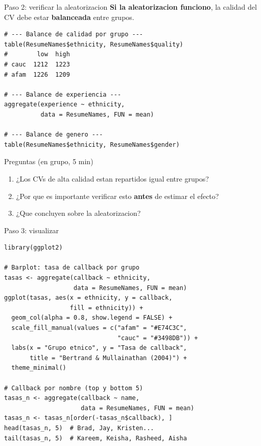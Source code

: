 \documentclass[aspectratio=169, 11pt]{beamer}
\begin{document}
\begin{frame}[fragile]{Paso 2: verificar la aleatorizacion}
\small
\textbf{Si la aleatorizacion funciono}, la calidad del CV debe estar \textbf{balanceada} entre grupos.

\begin{lstlisting}[basicstyle=\ttfamily\scriptsize]
# --- Balance de calidad por grupo ---
table(ResumeNames$ethnicity, ResumeNames$quality)
#        low  high
# cauc  1212  1223
# afam  1226  1209

# --- Balance de experiencia ---
aggregate(experience ~ ethnicity,
          data = ResumeNames, FUN = mean)

# --- Balance de genero ---
table(ResumeNames$ethnicity, ResumeNames$gender)
\end{lstlisting}

\vspace{0.2cm}
\begin{block}{Preguntas (en grupo, 5 min)}
\begin{enumerate}\setlength{\itemsep}{1pt}
  \item ¿Los CVs de alta calidad estan repartidos igual entre grupos?
  \item ¿Por que es importante verificar esto \textbf{antes} de estimar el efecto?
  \item ¿Que concluyen sobre la aleatorizacion?
\end{enumerate}
\end{block}
\end{frame}

\begin{frame}[fragile]{Paso 3: visualizar}
\begin{lstlisting}[basicstyle=\ttfamily\scriptsize]
library(ggplot2)

# Barplot: tasa de callback por grupo
tasas <- aggregate(callback ~ ethnicity,
                   data = ResumeNames, FUN = mean)
ggplot(tasas, aes(x = ethnicity, y = callback,
                  fill = ethnicity)) +
  geom_col(alpha = 0.8, show.legend = FALSE) +
  scale_fill_manual(values = c("afam" = "#E74C3C",
                               "cauc" = "#3498DB")) +
  labs(x = "Grupo etnico", y = "Tasa de callback",
       title = "Bertrand & Mullainathan (2004)") +
  theme_minimal()

# Callback por nombre (top y bottom 5)
tasas_n <- aggregate(callback ~ name,
                     data = ResumeNames, FUN = mean)
tasas_n <- tasas_n[order(-tasas_n$callback), ]
head(tasas_n, 5)  # Brad, Jay, Kristen...
tail(tasas_n, 5)  # Kareem, Keisha, Rasheed, Aisha
\end{lstlisting}
\end{frame}
\end{document}
